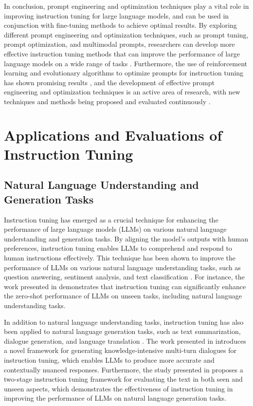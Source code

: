 \documentclass[11pt]{article}
\begin{document}
In conclusion, prompt engineering and optimization techniques play a vital role in improving instruction tuning for large language models, and can be used in conjunction with fine-tuning methods to achieve optimal results. By exploring different prompt engineering and optimization techniques, such as prompt tuning, prompt optimization, and multimodal prompts, researchers can develop more effective instruction tuning methods that can improve the performance of large language models on a wide range of tasks \cite{ref68}. Furthermore, the use of reinforcement learning and evolutionary algorithms to optimize prompts for instruction tuning has shown promising results \cite{ref69}, and the development of effective prompt engineering and optimization techniques is an active area of research, with new techniques and methods being proposed and evaluated continuously \cite{ref70}.

\section{Applications and Evaluations of Instruction Tuning}

\subsection{Natural Language Understanding and Generation Tasks}

Instruction tuning has emerged as a crucial technique for enhancing the performance of large language models (LLMs) on various natural language understanding and generation tasks. By aligning the model's outputs with human preferences, instruction tuning enables LLMs to comprehend and respond to human instructions effectively. This technique has been shown to improve the performance of LLMs on various natural language understanding tasks, such as question answering, sentiment analysis, and text classification \cite{ref71,ref2}. For instance, the work presented in \cite{ref71} demonstrates that instruction tuning can significantly enhance the zero-shot performance of LLMs on unseen tasks, including natural language understanding tasks.

In addition to natural language understanding tasks, instruction tuning has also been applied to natural language generation tasks, such as text summarization, dialogue generation, and language translation \cite{ref72,ref73}. The work presented in \cite{ref72} introduces a novel framework for generating knowledge-intensive multi-turn dialogues for instruction tuning, which enables LLMs to produce more accurate and contextually nuanced responses. Furthermore, the study presented in \cite{ref73} proposes a two-stage instruction tuning framework for evaluating the text in both seen and unseen aspects, which demonstrates the effectiveness of instruction tuning in improving the performance of LLMs on natural language generation tasks.
\end{document}

